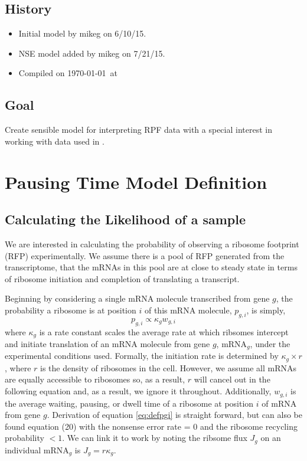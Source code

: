 \documentclass{article}
\newcommand{\waitTerm}{\ensuremath{w}\xspace}
\newcommand{\wgi}{\ensuremath{\waitTerm_{g,i}}\xspace}
\newcommand{\pgi}{\ensuremath{{p_{g,i}}}\xspace}
\newcommand{\kappag}{\ensuremath{{\kappa_{g}}}\xspace}
\newcommand{\mRNAg}{mRNA$_g$\xspace}
\begin{document}
\subsection*{History}
\begin{itemize}
\item Initial model  by mikeg on 6/10/15.
\item NSE model added by mikeg on 7/21/15.
\item Compiled on \today \ at \ \currenttime
 \end{itemize}
\subsection*{Goal}
\label{goal}
Create sensible model for interpreting RPF data with a special interest in working with data used in \citet{PopEtAl2014}.

\section*{Pausing Time Model Definition}
\subsection*{Calculating the Likelihood of a sample}
We are interested in calculating the probability of observing a ribosome footprint (RFP) experimentally.
We assume there is a pool of RFP generated from the transcriptome, that the mRNAs in this pool are at close to steady state in terms of ribosome initiation and completion of translating a transcript.

Beginning by considering a single mRNA molecule transcribed from gene $g$, the probability a ribosome is at position $i$ of this mRNA molecule, \pgi,  is simply,
\begin{equation} \label{eq:defpgi}
\pgi  \propto \kappag \wgi
\end{equation}
where \kappag is a rate constant scales the average rate at which ribsomes intercept and initiate translation of an mRNA molecule from gene $g$, \mRNAg, under the experimental conditions used.
Formally, the initiation rate is determined by $\kappag \times r$, where  $r$ is the density of ribosomes in the cell.
However, we assume all mRNAs are equally accessible to ribosomes so, as a result, $r$ will cancel out in the following equation and, as a result, we ignore it throughout.
Additionally, \wgi is the average waiting, pausing, or dwell time of a ribosome at position $i$ of mRNA from gene $g$.  
Derivation of equation \ref{eq:defpgi} is straight forward, but can also be found \citet{GilchristAndWagner2006} equation (20) with the nonsense error rate = 0 and the ribosome recycling probability $<1$.
We can link it to \citet{PopEtAl2014} work by noting the ribsome flux $J_g$ on an individual \mRNAg is $J_g = r \kappag$.
\end{document}
